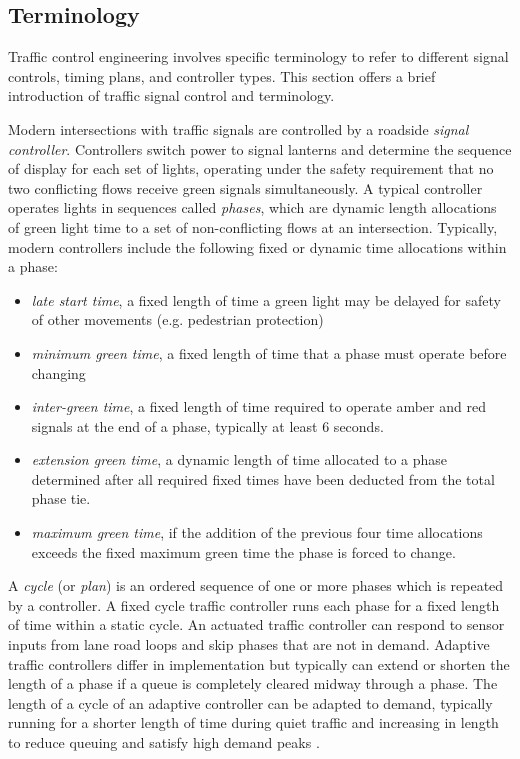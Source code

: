 \begin{appendices}

\chapter{Terminology}
\label{appendix:terminology}

Traffic control engineering involves specific terminology to refer to different signal controls, timing plans, and controller types. This section offers a brief introduction of traffic signal control and terminology.

Modern intersections with traffic signals are controlled by a roadside \emph{signal controller}. Controllers switch power to signal lanterns and determine the sequence of display for each set of lights, operating under the safety requirement that no two conflicting flows receive green signals simultaneously. A typical controller operates lights in sequences called \emph{phases}, which are dynamic length allocations of green light time to a set of non-conflicting flows at an intersection. Typically, modern controllers include the following fixed or dynamic time allocations within a phase:

\begin{itemize}
\item \emph{late start time}, a fixed length of time a green light may be delayed for safety of other movements (e.g. pedestrian protection)
\item \emph{minimum green time}, a fixed length of time that a phase must operate before changing
\item \emph{inter-green time}, a fixed length of time required to operate amber and red signals at the end of a phase, typically at least 6 seconds. 
\item \emph{extension green time}, a dynamic length of time allocated to a phase determined after all required fixed times have been deducted from the total phase tie. 
\item \emph{maximum green time}, if the addition of the previous four time allocations exceeds the fixed maximum green time the phase is forced to change. 
\end{itemize}

A \emph{cycle} (or \emph{plan}) is an ordered sequence of one or more phases which is repeated by a controller. A fixed cycle traffic controller runs each phase for a fixed length of time within a static cycle. An actuated traffic controller can respond to sensor inputs from lane road loops and skip phases that are not in demand. Adaptive traffic controllers differ in implementation but typically can extend or shorten the length of a phase if a queue is completely cleared midway through a phase. The length of a cycle of an adaptive controller can be adapted to demand, typically running for a shorter length of time during quiet traffic and increasing in length to reduce queuing and satisfy high demand peaks \cite{scatstraining}.


\end{appendices}
